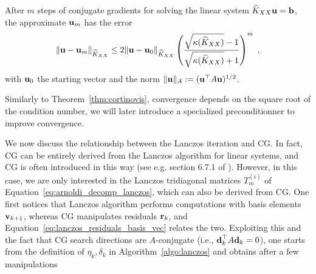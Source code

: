 \documentclass{article}
\begin{document}
\begin{theorem} \label{thm:cg_convergence}
After $m$ steps of conjugate gradients for solving the linear system $\widehat K_{XX} \boldsymbol{\mathbf{u}} = \boldsymbol{\mathbf{b}}$, the approximate $\boldsymbol{\mathbf{u}}_m$ has the error
\begin{equation*}
    \Vert \boldsymbol{\mathbf{u}} - \boldsymbol{\mathbf{u}}_m \Vert_{\widehat K_{XX}} \le 2\Vert \boldsymbol{\mathbf{u}} - \boldsymbol{\mathbf{u}}_0 \Vert_{\widehat K_{XX}} \left(  \frac{\sqrt{\kappa(\widehat K_{XX})} - 1}{\sqrt{ \kappa(\widehat K_{XX})} + 1} \right)^m \; ,
\end{equation*}
with $\boldsymbol{\mathbf{u}}_0$ the starting vector and the norm $\Vert \boldsymbol{\mathbf{u}} \Vert_A := (\boldsymbol{\mathbf{u}}^\top A \boldsymbol{\mathbf{u}})^{1/2}$.

\end{theorem}

Similarly to Theorem~\ref{thm:cortinovis}, convergence depends on the square root of the condition number, we will later introduce a specialized preconditionner to improve convergence.


We now discuss the relationship between the Lanczos iteration and CG. 
In fact, CG can be entirely derived from the Lanczos algorithm for linear systems, and CG is often introduced in this way (see e.g. section 6.7.1 of \cite{saad_iterative_2003}). However, in this case, we are only interested in the Lanczos tridiagonal matrices $T_m^{(i)}$ of Equation~\eqref{eq:arnoldi_decomp_lanczos}, which can also be derived from CG. One first notices that Lanczos algorithm performs computations with basis elements $\boldsymbol{\mathbf{v}}_{k+1}$, whereas CG manipulates residuals $\boldsymbol{\mathbf{r}}_k$, and Equation~\eqref{eq:lanczos_residuals_basis_vec} relates the two. Exploiting this and the fact that CG search directions are $A$-conjugate (i.e., $\boldsymbol{\mathbf{d}}_k^\top A \boldsymbol{\mathbf{d}}_k = 0$), one starts from the definition of $\eta_k, \delta_k$ in Algorithm~\ref{algo:lanczos} and obtains after a few manipulations
\end{document}
